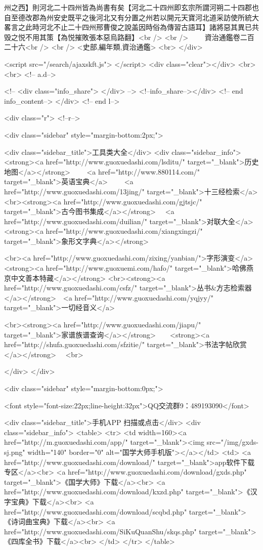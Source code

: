 州之西】則河北二十四州皆為尚書有矣【河北二十四州即玄宗所謂河朔二十四郡也自至德改郡為州安史既平之後河北又有分置之州若以開元天寶河北道采訪使所統大畧言之此時河北不止二十四州邢曹俊之說盖因時俗為傳習古語耳】諸將惡其異已共毁之悦不用其策【為悦摧敗張本惡烏路翻】<br />
<br />
　　資治通鑑卷二百二十六<br />
<br />
<史部,編年類,資治通鑑>  <br>
   </div> 

<script src="/search/ajaxskft.js"> </script>
 <div class="clear"></div>
<br>
<br>
 <!-- a.d-->

 <!--
<div class="info_share">
</div> 
-->
 <!--info_share--></div>   <!-- end info_content-->
  </div> <!-- end l-->

<div class="r">   <!--r-->



<div class="sidebar"  style="margin-bottom:2px;">

 
<div class="sidebar_title">工具类大全</div>
<div class="sidebar_info">
<strong><a href="http://www.guoxuedashi.com/lsditu/" target="_blank">历史地图</a></strong>　　
<a href="http://www.880114.com/" target="_blank">英语宝典</a>　　
<a href="http://www.guoxuedashi.com/13jing/" target="_blank">十三经检索</a>　
<br><strong><a href="http://www.guoxuedashi.com/gjtsjc/" target="_blank">古今图书集成</a></strong>　
<a href="http://www.guoxuedashi.com/duilian/" target="_blank">对联大全</a>　<strong><a href="http://www.guoxuedashi.com/xiangxingzi/" target="_blank">象形文字典</a></strong>　

<br><a href="http://www.guoxuedashi.com/zixing/yanbian/">字形演变</a>　　<strong><a href="http://www.guoxuemi.com/hafo/" target="_blank">哈佛燕京中文善本特藏</a></strong>
<br><strong><a href="http://www.guoxuedashi.com/csfz/" target="_blank">丛书&方志检索器</a></strong>　<a href="http://www.guoxuedashi.com/yqjyy/" target="_blank">一切经音义</a>　　

<br><strong><a href="http://www.guoxuedashi.com/jiapu/" target="_blank">家谱族谱查询</a></strong>　　<strong><a href="http://shufa.guoxuedashi.com/sfzitie/" target="_blank">书法字帖欣赏</a></strong>　
<br>

</div>
</div>


<div class="sidebar" style="margin-bottom:0px;">

<font style="font-size:22px;line-height:32px">QQ交流群9：489193090</font>


<div class="sidebar_title">手机APP 扫描或点击</div>
<div class="sidebar_info">
<table>
<tr>
	<td width=160><a href="http://m.guoxuedashi.com/app/" target="_blank"><img src="/img/gxds-sj.png" width="140"  border="0" alt="国学大师手机版"></a></td>
	<td>
<a href="http://www.guoxuedashi.com/download/" target="_blank">app软件下载专区</a><br>
<a href="http://www.guoxuedashi.com/download/gxds.php" target="_blank">《国学大师》下载</a><br>
<a href="http://www.guoxuedashi.com/download/kxzd.php" target="_blank">《汉字宝典》下载</a><br>
<a href="http://www.guoxuedashi.com/download/scqbd.php" target="_blank">《诗词曲宝典》下载</a><br>
<a href="http://www.guoxuedashi.com/SiKuQuanShu/skqs.php" target="_blank">《四库全书》下载</a><br>
</td>
</tr>
</table>


